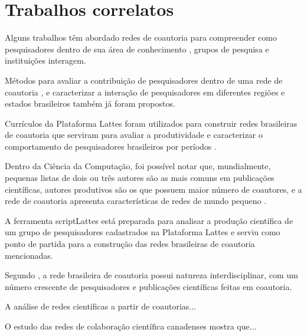 \chapter[Trabalhos correlatos]{Trabalhos correlatos}

Alguns trabalhos têm abordado redes de coautoria para compreender como pesquisadores dentro de sua área de conhecimento \cite{mena2014brazilian} \cite{franceschet2011collaboration} \cite{santin2016collaboration}, grupos de pesquisa \cite{delgado2014analyzing} e instituições \cite{ioannidis2008measuring} interagem.

Métodos para avaliar a contribuição de pesquisadores dentro de uma rede de coautoria \cite{liu2005co} \cite{franceschet2011collaboration}, e caracterizar a interação de pesquisadores em diferentes regiões e estados brasileiros \cite{sidone2016ciencia} também já foram propostos.

Currículos da Plataforma Lattes foram utilizados para construir redes brasileiras de coautoria que serviram para avaliar a produtividade e caracterizar o comportamento de pesquisadores brasileiros por períodos \cite{mena2014brazilian}.

Dentro da Ciência da Computação, foi possível notar que, mundialmente, pequenas listas de dois ou três autores são as mais comuns em publicações científicas, autores produtivos são os que possuem maior número de coautores, e a rede de coautoria apresenta características de redes de mundo pequeno \cite{franceschet2011collaboration}.

A ferramenta scriptLattes \cite{mena2009scriptlattes} está preparada para analisar a produção científica de um grupo de pesquisadores cadastrados na Plataforma Lattes \cite{mena2013prospecccao} e serviu como ponto de partida para a construção das redes brasileiras de coautoria mencionadas.

Segundo , a rede brasileira de coautoria possui natureza interdisciplinar, com um número crescente de pesquisadores e publicações científicas feitas em coautoria.

A análise de redes científicas a partir de coautorias... \cite{glanzel2004analysing}

O estudo das redes de colaboração científica canadenses mostra que... \cite{lariviere2006canadian}

